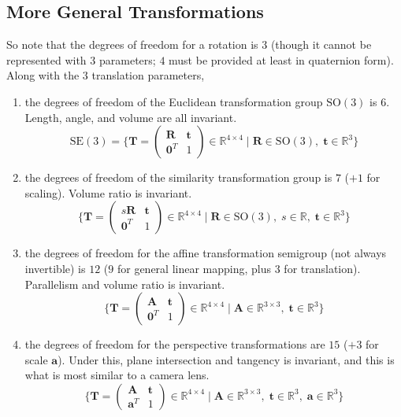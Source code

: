 \documentclass{article}
\theoremstyle{definition}
\theoremstyle{remark}
\theoremstyle{definition}
\begin{document}
\subsection{More General Transformations}

So note that the degrees of freedom for a rotation is $3$ (though it cannot be represented with $3$ parameters; $4$ must be provided at least in quaternion form). Along with the $3$ translation parameters, 
\begin{enumerate}
    \item the degrees of freedom of the Euclidean transformation group $\mathrm{SO}(3)$ is $6$. Length, angle, and volume are all invariant. 
    \[\mathrm{SE}(3) = \bigg\{ \mathbf{T} = \begin{pmatrix} \mathbf{R} & \mathbf{t} \\ \mathbf{0}^T & 1 \end{pmatrix} \in \mathbb{R}^{4 \times 4} \mid \mathbf{R} \in \mathrm{SO}(3), \; \mathbf{t} \in \mathbb{R}^3 \bigg\}\]
    
    \item the degrees of freedom of the similarity transformation group is $7$ ($+1$ for scaling). Volume ratio is invariant. 
    \[\bigg\{ \mathbf{T} = \begin{pmatrix} s \mathbf{R} & \mathbf{t} \\ \mathbf{0}^T & 1 \end{pmatrix} \in \mathbb{R}^{4 \times 4} \mid \mathbf{R} \in \mathrm{SO}(3), \; s \in \mathbb{R}, \; \mathbf{t} \in \mathbb{R}^3 \bigg\}\]
    
    \item the degrees of freedom for the affine transformation semigroup (not always invertible) is $12$ ($9$ for general linear mapping, plus $3$ for translation). Parallelism and volume ratio is invariant. 
    \[\bigg\{ \mathbf{T} = \begin{pmatrix} \mathbf{A} & \mathbf{t} \\ \mathbf{0}^T & 1 \end{pmatrix} \in \mathbb{R}^{4 \times 4} \mid \mathbf{A} \in \mathbb{R}^{3 \times 3}, \; \mathbf{t} \in \mathbb{R}^3 \bigg\}\]
    
    \item the degrees of freedom for the perspective transformations are $15$ ($+3$ for scale $\mathbf{a}$). Under this, plane intersection and tangency is invariant, and this is what is most similar to a camera lens. 
    \[\bigg\{ \mathbf{T} = \begin{pmatrix} \mathbf{A} & \mathbf{t} \\ \mathbf{a}^T & 1 \end{pmatrix} \in \mathbb{R}^{4 \times 4} \mid \mathbf{A} \in \mathbb{R}^{3 \times 3}, \; \mathbf{t} \in \mathbb{R}^3, \; \mathbf{a} \in \mathbb{R}^3 \bigg\}\]
\end{enumerate}
\end{document}
